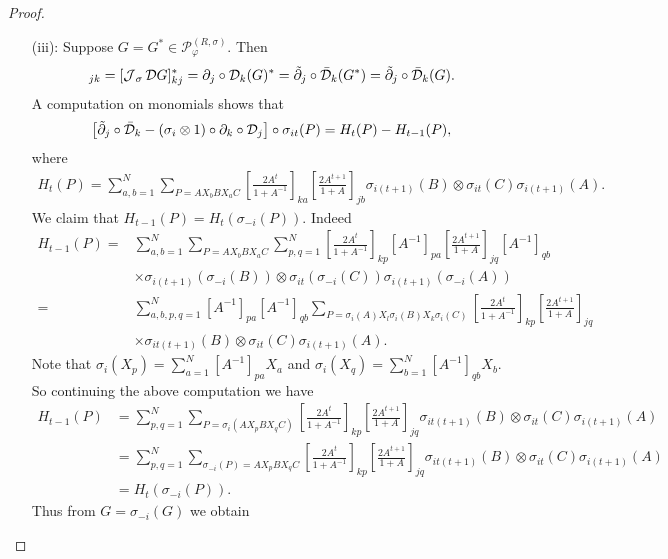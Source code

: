 \begin{proof}
\begin{enumerate}
	\item[(iii):] Suppose $G=G^*\in\mathscr{P}^{(R,\sigma)}_{\varphi}$. Then 
		\begin{equation*}
			[(\J_\sigma\D G)^*]_{jk}=[\J_\sigma\D G]_{kj}^*=\partial_j\circ\D_k(G)^*=\tilde{\partial}_j\circ\bar{\D}_k(G^*)=\tilde{\partial}_j\circ\bar{\D}_k(G).
		\end{equation*}		
	A computation on monomials shows that
		\begin{align*}
			\left[\tilde{\partial}_j\circ\bar{\mathcal D}_k-(\sigma_i\otimes 1)\circ\partial_k\circ\mathcal D_j\right]\circ\sigma_{it}(P)=H_t(P)-H_{t-1}(P),
		\end{align*}
	where
		\begin{align*}
			H_t(P)=\sum_{a,b=1}^N \sum_{P=AX_bB X_a C}\left[\frac{2A^t}{1+A^{-1}}\right]_{ka}\left[\frac{2A^{t+1}}{1+A}\right]_{jb} \sigma_{i(t+1)}(B)\otimes \sigma_{it}(C)\sigma_{i(t+1)}(A).
		\end{align*}
	We claim that $H_{t-1}(P)=H_t(\sigma_{-i}(P))$. Indeed
	\begin{align*}
		H_{t-1}(P)=&\sum_{a,b=1}^N \sum_{P=AX_bBX_aC} \sum_{p,q=1}^N \left[\frac{2 A^t}{1+A^{-1}}\right]_{kp}[A^{-1}]_{pa}\left[\frac{2A^{t+1}}{1+A}\right]_{jq}[A^{-1}]_{qb}\\
				&\times \sigma_{i(t+1)}( \sigma_{-i}(B))\otimes \sigma_{it}(\sigma_{-i}(C)) \sigma_{i(t+1)}(\sigma_{-i}(A))\\
 =& \sum_{a,b,p,q=1}^N [A^{-1}]_{pa}[A^{-1}]_{qb}\sum_{P=\sigma_i(A)X_l\sigma_i(B)X_k\sigma_i(C)} \left[\frac{2 A^t}{1+A^{-1}}\right]_{kp} \left[\frac{2A^{t+1}}{1+A}\right]_{jq}\\
 				&\times \sigma_{it(t+1)}(B)\otimes \sigma_{it}(C)\sigma_{i(t+1)}(A).
	\end{align*}
Note that $\sigma_i(X_p)=\sum_{a=1}^N [A^{-1}]_{pa} X_a$ and $\sigma_i(X_q)=\sum_{b=1}^N [A^{-1}]_{qb} X_b$. So continuing the above computation we have
	\begin{align*}
		H_{t-1}(P)&=\sum_{p,q=1}^N \sum_{P=\sigma_i(AX_pBX_qC)} \left[\frac{2 A^t}{1+A^{-1}}\right]_{kp} \left[\frac{2A^{t+1}}{1+A}\right]_{jq} \sigma_{it(t+1)}(B)\otimes \sigma_{it}(C)\sigma_{i(t+1)}(A)\\
				&=\sum_{p,q=1}^N \sum_{\sigma_{-i}(P)=AX_pBX_qC} \left[\frac{2 A^t}{1+A^{-1}}\right]_{kp} \left[\frac{2A^{t+1}}{1+A}\right]_{jq} \sigma_{it(t+1)}(B)\otimes \sigma_{it}(C)\sigma_{i(t+1)}(A)\\
				&=H_t(\sigma_{-i}(P)).
	\end{align*}
Thus from $G=\sigma_{-i}(G)$ we obtain

\end{enumerate}
\end{proof}
